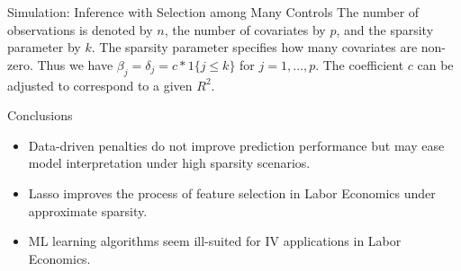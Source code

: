 \documentclass{beamer}
\begin{document}
\begin{frame}{Simulation: Inference with Selection among Many Controls}
The number of observations is denoted by \(n\), the number of covariates by \(p\), and the sparsity parameter by \(k\). The sparsity parameter specifies how many covariates are non-zero. Thus we have \(\beta_j = \delta_j = c * 1\{j \leq k\}\) for \(j = 1,\ldots,p\). The coefficient \(c\) can be adjusted to correspond to a given \(R^2\). 

	
\end{frame}



\begin{frame} {Conclusions}
\begin{itemize}
\item Data-driven penalties do not improve prediction performance but may ease model interpretation under high sparsity scenarios.
\item Lasso improves the process of feature selection in Labor Economics under approximate sparsity.  
\item ML learning algorithms seem  ill-suited for IV applications in Labor Economics.
\end{itemize}
\end{frame}
\end{document}
